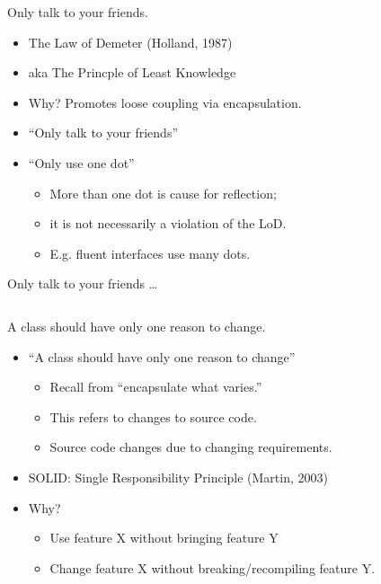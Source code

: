 \documentclass{beamer}
\begin{document}
\begin{frame}{Only talk to your friends.}
    \begin{itemize}
        \item The Law of Demeter (Holland, 1987)
        \item aka The Princple of Least Knowledge
        \item Why? Promotes loose coupling via encapsulation.
        \item ``Only talk to your friends''
        \item ``Only use one dot'' 
            \begin{itemize}
                \item More than one dot is cause for reflection; 
                \item it is not necessarily a violation of the LoD.
                \item E.g. fluent interfaces use many dots.
            \end{itemize}
    \end{itemize}
\end{frame}

\begin{frame}{Only talk to your friends \ldots}
    \vspace{0cm}
    \begin{columns}
        \column{\dimexpr\paperwidth-40pt}
        
    \end{columns}
\end{frame}

\begin{frame}{A class should have only one reason to change.}
    \begin{itemize}
        \item ``A class should have only one reason to change''
        \begin{itemize}
            \item Recall from ``encapsulate what varies.''
            \item This refers to changes to source code.
            \item Source code changes due to changing requirements.
        \end{itemize}
    \item SOLID: Single Responsibility Principle (Martin, 2003)
    \item Why? 
        \begin{itemize}
            \item Use feature X without bringing feature Y
            \item Change feature X without breaking/recompiling feature Y.
        \end{itemize}
    \end{itemize}
\end{frame}
\end{document}

